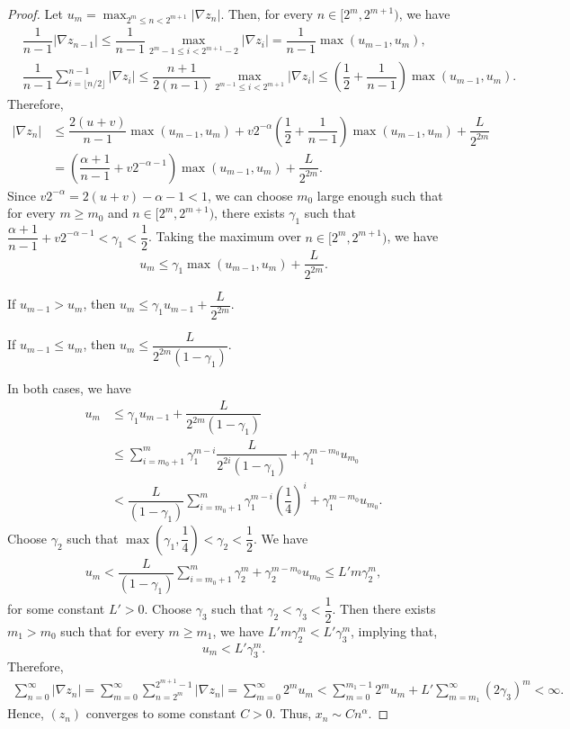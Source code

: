 \begin{proof}
  Let $u_m = \max_{2^m \le n < 2^{m+1}} |\nabla z_n|$. Then, for every $n\in [2^m, 2^{m+1})$, we have
  \begin{align*}
     & \dfrac{1}{n-1}|\nabla z_{n-1}| \le \dfrac{1}{n-1}\max_{2^m-1\le i < 2^{m+1}-2}|\nabla z_i| = \dfrac{1}{n-1}\max(u_{m-1},u_m),                                                                      \\
     & \dfrac{1}{n-1}\sum_{i=\lfloor n/2\rfloor}^{n-1}|\nabla z_{i}| \le \dfrac{n+1}{2(n-1)}\max_{2^{m-1}\le i < 2^{m+1}} |\nabla z_i| \le \left(\dfrac{1}{2}+\dfrac{1}{n-1}\right) \max(u_{m-1}, u_{m}).
  \end{align*}
  Therefore,
  \begin{align*}
    |\nabla z_{n}|
     & \le \dfrac{2(u+v)}{n-1}\max(u_{m-1},u_m) + v2^{-\alpha}\left(\dfrac{1}{2}+\dfrac{1}{n-1}\right)\max(u_{m-1}, u_m) + \dfrac{L}{2^{2m}} \\
     & = \left(\dfrac{\alpha+1}{n-1}+ v2^{-\alpha-1}\right)\max(u_{m-1}, u_m) + \dfrac{L}{2^{2m}}.
  \end{align*}
  Since $v2^{-\alpha} = 2(u+v)-\alpha-1 < 1$, we can choose $m_0$ large enough such that for every $m\ge m_0$ and $n\in [2^m, 2^{m+1})$, there exists $\gamma_1$ such that $\dfrac{\alpha+1}{n-1}+ v2^{-\alpha-1} < \gamma_1 < \dfrac{1}{2}$. Taking the maximum over $n\in [2^m, 2^{m+1})$, we have
  $$u_m \le \gamma_1\max(u_{m-1}, u_m) + \dfrac{L}{2^{2m}}.$$

  If $u_{m-1} > u_m$, then $u_m \le \gamma_1 u_{m-1} + \dfrac{L}{2^{2m}}.$

  If $u_{m-1} \le u_m$, then $u_m \le \dfrac{L}{2^{2m}(1-\gamma_1)}.$

  In both cases, we have
  \begin{align*}
    u_m
     & \le \gamma_1 u_{m-1} + \dfrac{L}{2^{2m}(1-\gamma_1)}                                                             \\
     & \le \sum_{i=m_0+1}^m \gamma_1^{m-i}\dfrac{L}{2^{2i}(1-\gamma_1)} + \gamma_1^{m-m_0}u_{m_0}                       \\
     & < \dfrac{L}{(1-\gamma_1)}\sum_{i=m_0+1}^m \gamma_1^{m-i}\left(\dfrac{1}{4}\right)^{i} + \gamma_1^{m-m_0}u_{m_0}.
  \end{align*}
  Choose $\gamma_2$ such that $\max\left(\gamma_1, \dfrac{1}{4}\right) < \gamma_2 < \dfrac{1}{2}$. We have
  \begin{align*}
    u_m < \dfrac{L}{(1-\gamma_1)}\sum_{i=m_0+1}^m \gamma_2^m + \gamma_2^{m-m_0}u_{m_0} \le L'm\gamma_2^m,
  \end{align*}
  for some constant $L'>0$. Choose $\gamma_3$ such that $\gamma_2 < \gamma_3 < \dfrac{1}{2}$. Then there exists $m_1>m_0$ such that for every $m\ge m_1$, we have $L'm\gamma_2^m < L'\gamma_3^m$, implying that,
  $$u_m < L'\gamma_3^m.$$
  Therefore,
  \begin{align*}
    \sum_{n=0}^\infty|\nabla z_{n}| = \sum_{m=0}^\infty \sum_{n=2^m}^{2^{m+1}-1}|\nabla z_n| = \sum_{m=0}^\infty 2^m u_m < \sum_{m=0}^{m_1-1} 2^m u_m  + L'\sum_{m=m_1}^\infty (2\gamma_3)^{m} < \infty.
  \end{align*}
  Hence, $(z_n)$ converges to some constant $C>0$. Thus, $x_n \sim Cn^\alpha$.
\end{proof}
